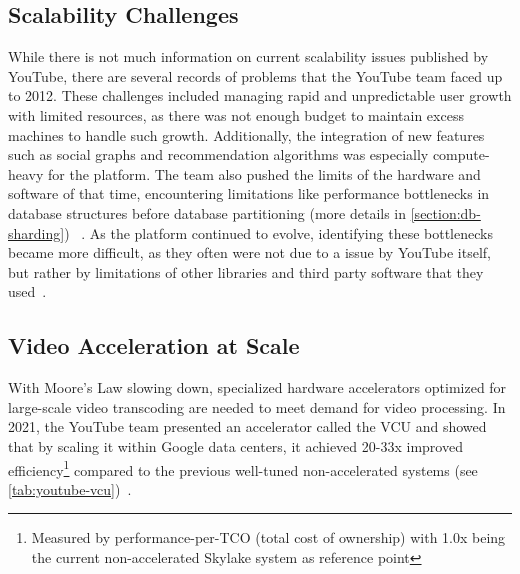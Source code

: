 

\subsection{Scalability Challenges}

While there is not much information on current scalability issues published by YouTube, there are several records of problems that the YouTube team faced up to 2012. These challenges included managing rapid and unpredictable user growth with limited resources, as there was not enough budget to maintain excess machines to handle such growth. Additionally, the integration of new features such as social graphs and recommendation algorithms was especially compute-heavy for the platform. The team also pushed the limits of the hardware and software of that time, encountering limitations like performance bottlenecks in database structures before database partitioning (more details in \autoref{section:db-sharding}) ~\parencite{youtube_challenges}. As the platform continued to evolve, identifying these bottlenecks became more difficult, as they often were not due to a issue by YouTube itself, but rather by limitations of other libraries and third party software that they used~\parencite{youtube_challenges_2}.

\subsection{Video Acceleration at Scale}

With Moore's Law slowing down, specialized hardware accelerators optimized for large-scale video transcoding are needed to meet demand for video processing. 
In 2021, the YouTube team presented an accelerator called the \ac{VCU} and showed that by scaling it within Google data centers, it achieved 20-33x improved efficiency\footnote{Measured by performance-per-TCO (total cost of ownership) with 1.0x being the current non-accelerated Skylake system as reference point} compared to the previous well-tuned non-accelerated systems (see \autoref{tab:youtube-vcu})~\parencite{youtube_infrastructure}.

